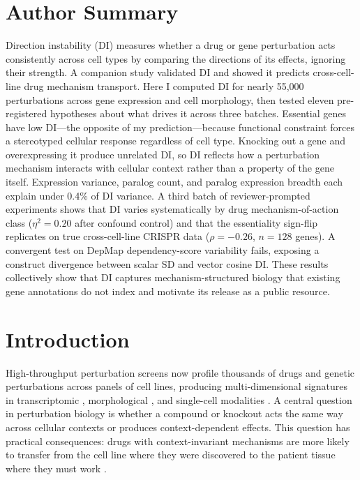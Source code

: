\documentclass[11pt]{article}
\begin{document}
\begin{abstract}
DI captures a cross-modally reproducible interaction between
perturbation mechanism and cellular context that existing gene
annotations do not.  The atlas, pre-registration documents, and analysis
code are publicly available.
\end{abstract}

\section*{Author Summary}
Direction instability (DI) measures whether a drug or gene perturbation
acts consistently across cell types by comparing the directions of its
effects, ignoring their strength.  A companion study validated DI and
showed it predicts cross-cell-line drug mechanism transport.  Here I
computed DI for nearly 55{,}000 perturbations across gene expression
and cell morphology, then tested eleven pre-registered hypotheses about
what drives it across three batches.  Essential genes
have low DI---the opposite of my prediction---because functional
constraint forces a stereotyped cellular response regardless of cell
type.  Knocking out a gene and overexpressing it produce unrelated DI,
so DI reflects how a perturbation mechanism interacts with cellular
context rather than a property of the gene itself.  Expression variance,
paralog count, and paralog expression breadth each explain under 0.4\%
of DI variance.  A third batch of reviewer-prompted experiments shows
that DI varies systematically by drug mechanism-of-action class
($\eta^2 = 0.20$ after confound control) and that the essentiality
sign-flip replicates on true cross-cell-line CRISPR data ($\rho = -0.26$,
$n = 128$ genes).  A convergent test on DepMap dependency-score
variability fails, exposing a construct divergence between scalar SD
and vector cosine DI.  These results collectively show that DI
captures mechanism-structured biology that existing gene annotations do
not index and motivate its release as a public resource.


\section{Introduction}

High-throughput perturbation screens now profile thousands of drugs and
genetic perturbations across panels of cell lines, producing
multi-dimensional signatures in transcriptomic
\citep{subramanian2017next}, morphological \citep{bray2016cell}, and
single-cell modalities \citep{tahoe2025}.  A central question in
perturbation biology is whether a compound or knockout acts the same way
across cellular contexts or produces context-dependent effects.  This
question has practical consequences: drugs with context-invariant
mechanisms are more likely to transfer from the cell line where they were
discovered to the patient tissue where they must work
\citep{tower2026confound}.
\end{document}
